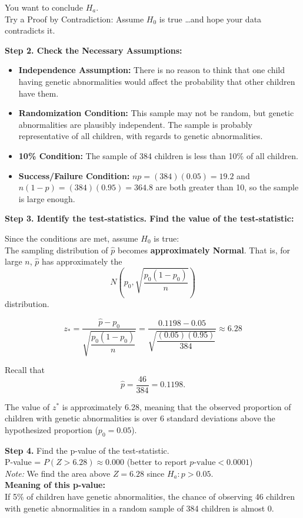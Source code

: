 \begin{example}
You want to conclude $H_a$. \\
Try a Proof by Contradiction: Assume $H_0$ is true \dots and hope your data contradicts it.

\vspace{1em}
\textbf{Step 2. Check the Necessary Assumptions:}

\begin{itemize}
  \item \textbf{Independence Assumption:} There is no reason to think that one child having genetic abnormalities would affect the probability that other children have them.

  \item \textbf{Randomization Condition:} This sample may not be random, but genetic abnormalities are plausibly independent. The sample is probably representative of all children, with regards to genetic abnormalities.

  \item \textbf{10\% Condition:} The sample of 384 children is less than 10\% of all children.

  \item \textbf{Success/Failure Condition:} $np = (384)(0.05) = 19.2$ and \\
  $n(1 - p) = (384)(0.95) = 364.8$ are both greater than 10, so the sample is large enough.
\end{itemize}
\vspace{1em}
\textbf{Step 3. Identify the test-statistics. Find the value of the test-statistic:}

Since the conditions are met, assume $H_0$ is true: \\
The sampling distribution of $\hat{p}$ becomes \textbf{approximately Normal}. That is, for large $n$, $\hat{p}$ has approximately the
\[
N\left(p_0, \sqrt{\frac{p_0(1 - p_0)}{n}}\right)
\]
distribution.

\[
z_\ast = \frac{\hat{p} - p_0}{\sqrt{\dfrac{p_0(1 - p_0)}{n}}}
= \frac{0.1198 - 0.05}{\sqrt{\dfrac{(0.05)(0.95)}{384}}}
\approx 6.28
\]

Recall that
\[
\hat{p} = \frac{46}{384} = 0.1198.
\]

The value of $z^\ast$ is approximately 6.28, meaning that the observed proportion of children with genetic abnormalities is over 6 standard deviations above the hypothesized proportion ($p_0 = 0.05$). 

\vspace{1em}
\textbf{Step 4.} Find the p-value of the test-statistic.\\
P-value = $P(Z > 6.28) \approx 0.000$ \textnormal{(better to report $p\text{-value} < 0.0001$)}\\
\textit{Note:} We find the area above $Z = 6.28$ since $H_a : p > 0.05$.\\[0.5em]
\textbf{Meaning of this p-value:}\\
If 5\% of children have genetic abnormalities, the chance of observing 46 children with genetic abnormalities in a random sample of 384 children is almost 0.


\end{example}
